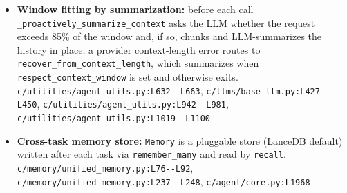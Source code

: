 \begin{itemize}
\item \textbf{Window fitting by summarization:} before each call \texttt{\_\allowbreak{}proactively\_\allowbreak{}summarize\_\allowbreak{}context} asks the LLM whether the request exceeds 85\% of the window and, if so, chunks and LLM-summarizes the history in place; a provider context-length error routes to \texttt{recover\_\allowbreak{}from\_\allowbreak{}context\_\allowbreak{}length}, which summarizes when \texttt{respect\_\allowbreak{}context\_\allowbreak{}window} is set and otherwise exits. \texttt{c/\allowbreak{}utilities/\allowbreak{}agent\_\allowbreak{}utils.\allowbreak{}py:\allowbreak{}L632-\allowbreak{}-\allowbreak{}L663}, \texttt{c/\allowbreak{}llms/\allowbreak{}base\_\allowbreak{}llm.\allowbreak{}py:\allowbreak{}L427-\allowbreak{}-\allowbreak{}L450}, \texttt{c/\allowbreak{}utilities/\allowbreak{}agent\_\allowbreak{}utils.\allowbreak{}py:\allowbreak{}L942-\allowbreak{}-\allowbreak{}L981}, \texttt{c/\allowbreak{}utilities/\allowbreak{}agent\_\allowbreak{}utils.\allowbreak{}py:\allowbreak{}L1019-\allowbreak{}-\allowbreak{}L1100}
\item \textbf{Cross-task memory store:} \texttt{Memory} is a pluggable store (LanceDB default) written after each task via \texttt{remember\_\allowbreak{}many} and read by \texttt{recall}. \texttt{c/\allowbreak{}memory/\allowbreak{}unified\_\allowbreak{}memory.\allowbreak{}py:\allowbreak{}L76-\allowbreak{}-\allowbreak{}L92}, \texttt{c/\allowbreak{}memory/\allowbreak{}unified\_\allowbreak{}memory.\allowbreak{}py:\allowbreak{}L237-\allowbreak{}-\allowbreak{}L248}, \texttt{c/\allowbreak{}agent/\allowbreak{}core.\allowbreak{}py:\allowbreak{}L1968}
\end{itemize}

